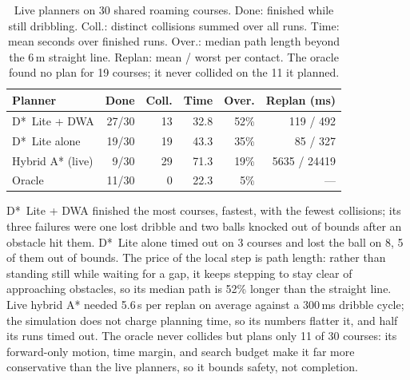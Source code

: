 \documentclass[10pt,twocolumn]{article}
\begin{document}
\begin{table}[h]
\centering
\small
\setlength{\tabcolsep}{2.5pt}
\begin{tabular}{@{}lrrrrr@{}}
\toprule
\textbf{Planner} & \textbf{Done} & \textbf{Coll.} & \textbf{Time} & \textbf{Over.} & \textbf{Replan (ms)} \\
\midrule
D*~Lite + DWA    & 27/30 & 13 & 32.8 & 52\% & 119 / 492 \\
D*~Lite alone    & 19/30 & 19 & 43.3 & 35\% & 85 / 327 \\
Hybrid A* (live) & 9/30  & 29 & 71.3 & 19\% & 5635 / 24419 \\
\midrule
Oracle           & 11/30 & 0  & 22.3 & 5\%  & --- \\
\bottomrule
\end{tabular}
\caption{Live planners on 30 shared roaming courses. Done: finished
while still dribbling. Coll.: distinct collisions summed over all runs.
Time: mean seconds over finished runs. Over.: median path length beyond
the 6\,m straight line. Replan: mean / worst per contact. The oracle
found no plan for 19 courses; it never collided on the 11 it planned.}
\label{tab:planners}
\end{table}

D*~Lite + DWA finished the most courses, fastest, with the fewest
collisions; its three failures were one lost dribble and two balls knocked
out of bounds after an obstacle hit them. D*~Lite alone timed out on 3
courses and lost the ball on 8, 5 of them out of bounds. The price of the local step is path
length: rather than standing still while waiting for a gap, it keeps
stepping to stay clear of approaching obstacles, so its median path is
52\% longer than the straight line. Live hybrid A* needed 5.6\,s per replan
on average against a 300\,ms dribble cycle; the simulation does not charge
planning time, so its numbers flatter it, and half its runs timed out. The
oracle never collides but plans only 11 of 30 courses: its forward-only
motion, time margin, and search budget make it far more conservative than
the live planners, so it bounds safety, not completion.
\end{document}

